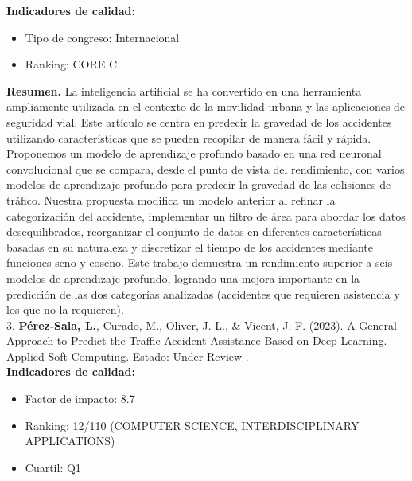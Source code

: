 \textbf{Indicadores de calidad:} 
\begin{itemize}
	\item Tipo de congreso: Internacional
	\item Ranking: CORE C
\end{itemize}

\textbf{Resumen.} La inteligencia artificial se ha convertido en una herramienta ampliamente utilizada en el contexto de la movilidad urbana y las aplicaciones de seguridad vial. Este artículo se centra en predecir la gravedad de los accidentes utilizando características que se pueden recopilar de manera fácil y rápida. Proponemos un modelo de aprendizaje profundo basado en una red neuronal convolucional que se compara, desde el punto de vista del rendimiento, con varios modelos de aprendizaje profundo para predecir la gravedad de las colisiones de tráfico. Nuestra propuesta modifica un modelo anterior al refinar la categorización del accidente, implementar un filtro de área para abordar los datos desequilibrados, reorganizar el conjunto de datos en diferentes características basadas en su naturaleza y discretizar el tiempo de los accidentes mediante funciones seno y coseno. Este trabajo demuestra un rendimiento superior a seis modelos de aprendizaje profundo, logrando una mejora importante en la predicción de las dos categorías analizadas (accidentes que requieren asistencia y los que no la requieren). \\


3. \textbf{Pérez-Sala, L.}, Curado, M., Oliver, J. L., \& Vicent, J. F. (2023). A General Approach to Predict the Traffic Accident Assistance Based on Deep Learning. Applied Soft Computing. Estado: Under Review .\\

\textbf{Indicadores de calidad:} 
\begin{itemize}
	\item Factor de impacto: 8.7
	\item Ranking: 12/110 (COMPUTER SCIENCE, INTERDISCIPLINARY APPLICATIONS)
	
	\item Cuartil: Q1
\end{itemize}

